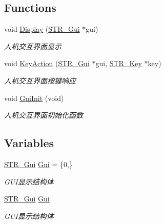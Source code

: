 \subsection*{\-Functions}
\begin{DoxyCompactItemize}
\item 
void \hyperlink{group___g_u_i_ga20ba41880982ef54f58aa4bc99e60b8c}{\-Display} (\hyperlink{struct_s_t_r___gui}{\-S\-T\-R\-\_\-\-Gui} $\ast$gui)
\begin{DoxyCompactList}\small\item\em 人机交互界面显示 \end{DoxyCompactList}\item 
void \hyperlink{group___g_u_i_ga60bf00524cdf8112890394a49a79f84c}{\-Key\-Action} (\hyperlink{struct_s_t_r___gui}{\-S\-T\-R\-\_\-\-Gui} $\ast$gui, \hyperlink{struct_s_t_r___key}{\-S\-T\-R\-\_\-\-Key} $\ast$key)
\begin{DoxyCompactList}\small\item\em 人机交互界面按键响应 \end{DoxyCompactList}\item 
void \hyperlink{group___g_u_i_gafec26559ec22791fb442dd8f2a8f213e}{\-Gui\-Init} (void)
\begin{DoxyCompactList}\small\item\em 人机交互界面初始化函数 \end{DoxyCompactList}\end{DoxyCompactItemize}
\subsection*{\-Variables}
\begin{DoxyCompactItemize}
\item 
\hypertarget{group___g_u_i_ga08f85ef3b2bfbbd0b5e4b2f69ed5a283}{\hyperlink{struct_s_t_r___gui}{\-S\-T\-R\-\_\-\-Gui} \hyperlink{group___g_u_i_ga08f85ef3b2bfbbd0b5e4b2f69ed5a283}{\-Gui} = \{0,\}}\label{group___g_u_i_ga08f85ef3b2bfbbd0b5e4b2f69ed5a283}

\begin{DoxyCompactList}\small\item\em \-G\-U\-I显示结构体 \end{DoxyCompactList}\item 
\hypertarget{group___g_u_i_ga08f85ef3b2bfbbd0b5e4b2f69ed5a283}{\hyperlink{struct_s_t_r___gui}{\-S\-T\-R\-\_\-\-Gui} \hyperlink{group___g_u_i_ga08f85ef3b2bfbbd0b5e4b2f69ed5a283}{\-Gui}}\label{group___g_u_i_ga08f85ef3b2bfbbd0b5e4b2f69ed5a283}

\begin{DoxyCompactList}\small\item\em \-G\-U\-I显示结构体 \end{DoxyCompactList}\end{DoxyCompactItemize}


